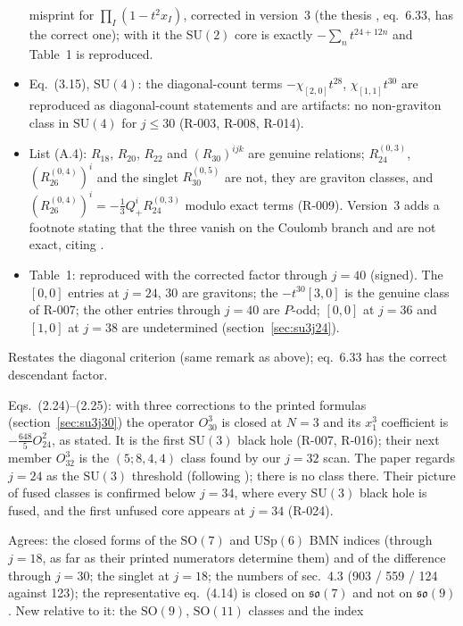 \documentclass[11pt]{article}
\newcommand{\R}[1]{\textsf{R-0#1}}
\newcommand{\SU}{\mathrm{SU}}
\newcommand{\SO}{\mathrm{SO}}
\newcommand{\USp}{\mathrm{USp}}
\begin{document}
\begin{description}[style=nextline,leftmargin=1.2em]
\begin{itemize}
misprint for $\prod_I(1-t^2x_I)$, corrected in version~3 (the thesis \cite{LeeThesis}, eq.~6.33, has the correct one);
with it the $\SU(2)$ core is exactly $-\sum_nt^{24+12n}$ and Table~1 is reproduced.
\item Eq.~(3.15), $\SU(4)$: the diagonal-count terms $-\chi_{[2,0]}t^{28}$, $\chi_{[1,1]}t^{30}$ are reproduced as
diagonal-count statements and are artifacts: no non-graviton class in $\SU(4)$ for $j\le30$ (\R{03}, \R{08},
\R{14}).
\item List (A.4): $R_{18}$, $R_{20}$, $R_{22}$ and $(R_{30})^{ijk}$ are genuine relations; $R_{24}^{(0,3)}$,
$(R_{26}^{(0,4)})^i$ and the singlet $R_{30}^{(0,5)}$ are not, they are graviton classes, and
$(R_{26}^{(0,4)})^i=-\tfrac13Q^i_+R_{24}^{(0,3)}$ modulo exact terms (\R{09}). Version~3 adds a footnote stating
that the three vanish on the Coulomb branch and are not exact, citing \cite{KLLS}.
\item Table~1: reproduced with the corrected factor through $j=40$ (signed). The $[0,0]$ entries at $j=24$, 30 are
gravitons; the $-t^{30}[3,0]$ is the genuine class of \R{07}; the other entries through $j=40$ are $P$-odd; $[0,0]$ at
$j=36$ and $[1,0]$ at $j=38$ are undetermined (section~\ref{sec:su3j24}).
\end{itemize}
\item[Lee, thesis \cite{LeeThesis}.] Restates the diagonal criterion (same remark as above); eq.~6.33 has the correct
descendant factor.
\item[de Mello Koch, Kim, Kim, Lee, Lee \cite{dMK}.] Eqs.~(2.24)--(2.25): with three corrections to the printed formulas
(section~\ref{sec:su3j30}) the operator $O^3_{30}$ is closed at $N=3$ and its $x_1^3$ coefficient is
$-\tfrac{648}{5}O^2_{24}$, as stated. It is the first $\SU(3)$ black hole (\R{07}, \R{16}); their next member
$O^3_{32}$ is the $(5;8,4,4)$ class found by our $j=32$ scan. The paper regards $j=24$ as the $\SU(3)$ threshold
(following \cite{CCKLL}); there is no class there. Their picture of fused classes is confirmed below $j=34$, where
every $\SU(3)$ black hole is fused, and the first unfused core appears at $j=34$ (\R{24}).
\item[Gadde, Lee, Raj, Tomar \cite{GLRT}.] Agrees: the closed forms of the $\SO(7)$ and $\USp(6)$ BMN indices (through
$j=18$, as far as their printed numerators determine them) and of the difference through $j=30$; the singlet at
$j=18$; the numbers of sec.~4.3 (903 / 559 / 124 against 123); the representative eq.~(4.14) is closed on
$\mathfrak{so}(7)$ and not on $\mathfrak{so}(9)$. New relative to it: the $\SO(9)$, $\SO(11)$ classes and the index

\end{description}
\end{document}
